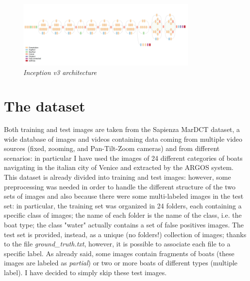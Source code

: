 \documentclass[12pt]{article}
\begin{document}
\begin{figure}[!ht]
	\centering %
	\includegraphics[width=0.8\textwidth]{inceptionv3.png} %
	\caption{\textit{Inception v3 architecture}} %
	\label{fig:inceptionv3}
\end{figure}

\section{The dataset}
\label{sec:dataset}
Both training and test images are taken from the Sapienza MarDCT dataset, a wide database of images and videos containing data coming from multiple video sources (fixed, zooming, and Pan-Tilt-Zoom cameras) and from different scenarios: in particular I have used the images of 24 different categories of boats navigating in the italian city of Venice and extracted by the ARGOS system. This dataset is already divided into training and test images: however, some preprocessing was needed in order to handle the different structure of the two sets of images and also because there were some multi-labeled images in the test set: in particular, the training set was organized in 24 folders, each containing a specific class of images; the name of each folder is the name of the class, i.e. the boat type; the class "water" actually contains a set of false positives images. The test set is provided, instead, as a unique (no folders!) collection of images; thanks to the file \textit{ground\_truth.txt}, however, it is possible to associate each file to a specific label. As already said, some images contain fragments of boats (these images are labeled as \textit{partial}) or two or more boats of different types (multiple label). I have decided to simply skip these test images.
\end{document}
